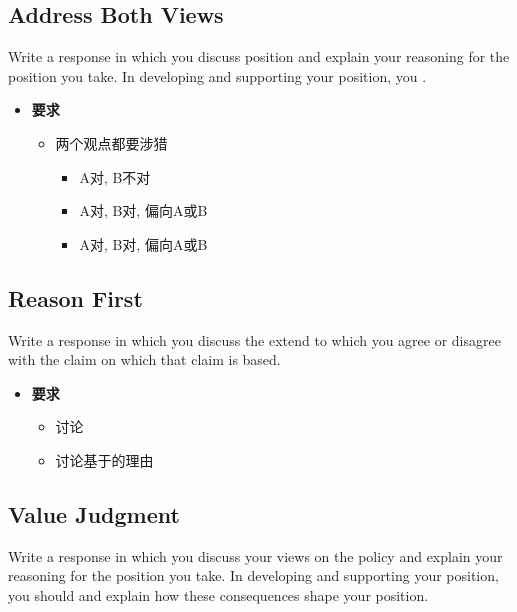   \subsection{Address Both Views}

    Write a response in which you discuss  position and explain your reasoning for the
    position you take. In developing and supporting your position, you
    .

    \begin{itemize}
      \item \textbf{要求}
      \begin{itemize}
        \item 两个观点都要涉猎
        \begin{itemize}
          \item A对, B不对
          \item A对, B对, 偏向A或B
          \item A对, B对, 偏向A或B
        \end{itemize}
      \end{itemize}
    \end{itemize}

  \subsection{Reason First}

    Write a response in which you discuss the extend to which you agree or
    disagree with the claim  on which that claim
    is based.

    \begin{itemize}
      \item \textbf{要求}
      \begin{itemize}
        \item 讨论
        \item 讨论基于的理由
      \end{itemize}
    \end{itemize}

  \subsection{Value Judgment}

    Write a response in which you discuss your views on the policy and
    explain your reasoning for the position you take. In developing and
    supporting your position, you should  and explain how these
    consequences shape your position.

